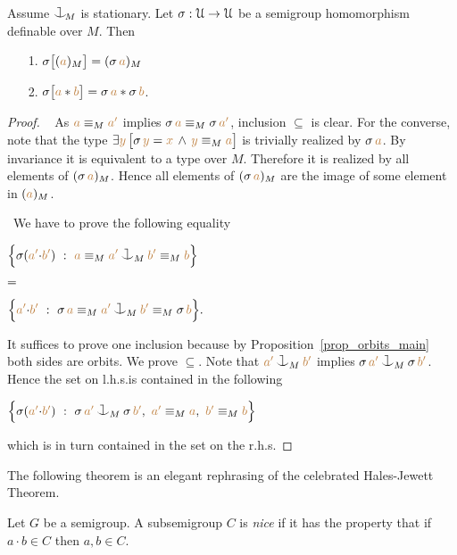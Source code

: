 \begin{proposition}\label{prop_HJ_tecnical}
  Assume $\cnonfork_{\!M}$ is stationary.
Let $\sigma:\EuScript U\to\EuScript U$ be a semigroup homomorphism definable over $M$.
Then 
\begin{itemize}
\item[1.] $\sigma\big[({\color{brown} a})_M\big]=(\sigma\,{\color{brown} a})_M$

\item[2.]
$\sigma\big[{\color{brown} a}*{\color{brown} b}\big]=\sigma\,{\color{brown} a}*\sigma\,{\color{brown} b}$.
\end{itemize}
\end{proposition}
\begin{proof}\   
As ${\color{brown} a}\equiv_M{\color{brown} a'}$ implies $\sigma\,{\color{brown} a}\equiv_M\sigma\,{\color{brown} a'}$,
inclusion $\subseteq$ is clear.
For the converse, note that the type 
$\exists{\color{brown}y}\,\big[\sigma\,{\color{brown} y}={\color{brown} x}\,\wedge\,{\color{brown} y}\equiv_M{\color{brown} a}\big]$ 
is trivially realized by $\sigma\,{\color{brown} a}$.
By invariance it is equivalent to a type over $M$.
Therefore it is realized by all elements of $(\sigma\,{\color{brown} a})_M$.
Hence all elements of $(\sigma\,{\color{brown} a})_M$ are the image of some element in $({\color{brown} a})_M$.

\def\medrel#1{\parbox[t]{6ex}{$\displaystyle\hfil #1$}}
\def\ceq#1#2#3{\parbox[t]{39ex}{$\displaystyle #1$}\medrel{#2}{$\displaystyle #3$}}
 \  
We have to prove the following equality\smallskip

\ceq{\hfill\Big\{\sigma({\mr a'}{\cdot}{\mr b'})\ :\ {\mr a}\equiv_M{\mr a'}\cnonfork_M{\mr b'}\equiv_M{\mr b} \Big\}}
{=}
{\Big\{{\mr a'}{\cdot}{\mr b'}\ :\ \sigma\,{\mr a}\equiv_M{\mr a'}\cnonfork_M{\mr b'}\equiv_M\sigma\,{\mr b} \Big\}.}\smallskip

It suffices to prove one inclusion because by Proposition~\ref{prop_orbits_main} both sides are orbits.
We prove $\subseteq$.
Note that ${\mr a'}\cnonfork_M{\mr b'}$ implies $\sigma\,{\mr a'}\cnonfork_M\sigma\,{\mr b'}$.
Hence the set on l.h.s.\@ is contained in the following\smallskip

\hfil$\Big\{\sigma({\mr a'}{\cdot}{\mr b'})\ :\ \sigma\,{\mr a'}\cnonfork_M\sigma\,{\mr b'},\ {\mr a'}\equiv_M{\mr a},\  {\mr b'}\equiv_M{\mr b} \Big\}$\smallskip

which is in turn contained in the set on the r.h.s.
\end{proof}
 
The following theorem is an elegant rephrasing of the celebrated Hales-Jewett Theorem.

Let $G$ be a semigroup.
A subsemigroup $C$ is \emph{nice\/} if it has the property that if $a{\cdot}b\in C$ then $a,b\in C$.

